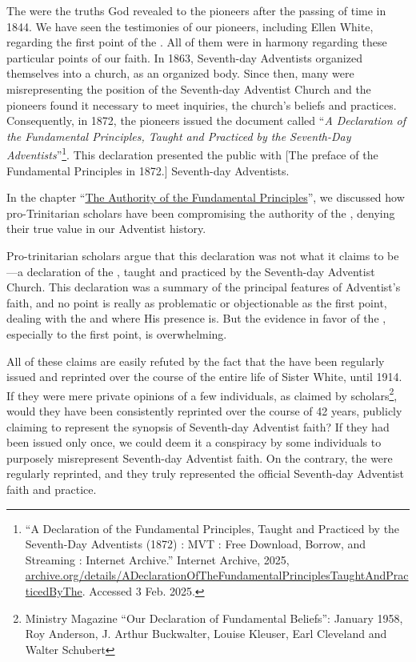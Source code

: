 The  were the truths God revealed to the pioneers after the passing of time in 1844. We have seen the testimonies of our pioneers, including Ellen White, regarding the first point of the . All of them were in harmony regarding these particular points of our faith. In 1863, Seventh-day Adventists organized themselves into a church, as an organized body. Since then, many were misrepresenting the position of the Seventh-day Adventist Church and the pioneers found it necessary to meet inquiries,  the church’s beliefs and practices. Consequently, in 1872, the pioneers issued the document called “\textit{A Declaration of the Fundamental Principles, Taught and Practiced by the Seventh-Day Adventists}”\footnote{“A Declaration of the Fundamental Principles, Taught and Practiced by the Seventh-Day Adventists (1872) : MVT : Free Download, Borrow, and Streaming : Internet Archive.” Internet Archive, 2025, \href{https://archive.org/details/ADeclarationOfTheFundamentalPrinciplesTaughtAndPracticedByThe}{archive.org/details/ADeclarationOfTheFundamentalPrinciplesTaughtAndPracticedByThe}. Accessed 3 Feb. 2025.}. This declaration presented the public with [The preface of the Fundamental Principles in 1872.] Seventh-day Adventists.

In the chapter “\hyperref[chap:authority]{The Authority of the Fundamental Principles}”, we discussed how pro-Trinitarian scholars have been compromising the authority of the , denying their true value in our Adventist history.

Pro-trinitarian scholars argue that this declaration was not what it claims to be—a declaration of the , taught and practiced by the Seventh-day Adventist Church. This declaration was a summary of the principal features of Adventist’s faith, and no point is really as problematic or objectionable as the first point, dealing with the  and where His presence is. But the evidence in favor of the , especially to the first point, is overwhelming.

All of these claims are easily refuted by the fact that the  have been regularly issued and reprinted over the course of the entire life of Sister White, until 1914. If they were mere private opinions of a few individuals, as claimed by scholars\footnote{Ministry Magazine “Our Declaration of Fundamental Beliefs”: January 1958, Roy Anderson, J. Arthur Buckwalter, Louise Kleuser, Earl Cleveland and Walter Schubert}, would they have been consistently reprinted over the course of 42 years, publicly claiming to represent the synopsis of Seventh-day Adventist faith? If they had been issued only once, we could deem it a conspiracy by some individuals to purposely misrepresent Seventh-day Adventist faith. On the contrary, the  were regularly reprinted, and they truly represented the official Seventh-day Adventist faith and practice.

